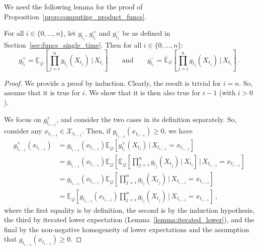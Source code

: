 \documentclass[twoside,11pt]{article}
\newcommand{\states}{\mathcal{X}}
\newcommand{\rateset}{\mathcal{Q}}
\begin{document}
We need the following lemma for the proof of Proposition~\ref{prop:computing_product_funcs}.
\begin{lemma}\label{lemma:product_func_induction}
For all $i\in\{0,\dots,n\}$, let $g_{t_i}$, $g_{t_i}^+$ and $g_{t_i}^-$ be as defined in Section~\ref{sec:funcs_single_time}. Then for all $i\in\{0,\dots,n\}$:
\begin{equation*}
g_{t_i}^+ = \underline{\mathbb{E}}_{\rateset}\left[\prod_{j=i}^{n}g_{t_j}(X_{t_j})\,\Bigg\vert\,X_{t_i}\right] \quad\quad\text{and} \quad\quad g_{t_i}^- = \overline{\mathbb{E}}_{\rateset}\left[\prod_{j=i}^{n}g_{t_j}(X_{t_j})\,\Bigg\vert\,X_{t_i}\right]\,.
\end{equation*}
\end{lemma}
\begin{proof}
We provide a proof by induction. Clearly, the result is trivial for $i=n$. So, assume that it is true for $i$. We show that it is then also true for $i-1$ (with $i>0$).

We focus on $g_{t_{i-1}}^+$, and consider the two cases in its definition separately. So, consider any $x_{t_{i-1}}\in\states_{t_{i-1}}$. Then, if $g_{t_{i-1}}(x_{t_{i-1}})\geq 0$, we have
\begin{align*}
g_{t_{i-1}}^+(x_{t_{i-1}}) &= g_{t_{i-1}}(x_{t_{i-1}}) \underline{\mathbb{E}}_{\rateset}\left[g_{t_{i}}^+(X_{t_{i}})\,\vert\,X_{t_{i-1}}=x_{t_{i-1}}\right] \\
 &= g_{t_{i-1}}(x_{t_{i-1}})\underline{\mathbb{E}}_{\rateset}\left[\underline{\mathbb{E}}_{\rateset}\left[\prod_{j=i}^{n}g_{t_j}(X_{t_j})\,\Bigg\vert\,X_{t_i}\right]\,\Bigg\vert\,X_{t_{i-1}}=x_{t_{i-1}}\right] \\
 &= g_{t_{i-1}}(x_{t_{i-1}})\underline{\mathbb{E}}_{\rateset}\left[\prod_{j=i}^{n}g_{t_j}(X_{t_j})\,\Bigg\vert\,X_{t_{i-1}}=x_{t_{i-1}}\right] \\ 
 &= \underline{\mathbb{E}}_{\rateset}\left[g_{t_{i-1}}(x_{t_{i-1}})\prod_{j=i}^{n}g_{t_j}(X_{t_j})\,\Bigg\vert\,X_{t_{i-1}}=x_{t_{i-1}}\right]\,,
\end{align*}
where the first equality is by definition, the second is by the induction hypothesis, the third by iterated lower expectation (Lemma~\ref{lemma:iterated_lower}), and the final by the non-negative homogeneity of lower expectations and the assumption that $g_{t_{i-1}}(x_{t_{i-1}})\geq 0$.


\end{proof}
\end{document}
